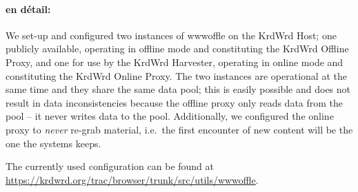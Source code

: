 \begin{longversion}
\paragraph{en d\'{e}tail:}
We set-up and configured two instances of wwwoffle on the KrdWrd Host;
one publicly available, operating in offline mode and constituting the KrdWrd Offline Proxy, and one for use by the KrdWrd Harvester, operating in online mode and constituting the KrdWrd Online Proxy. 
The two instances are operational at the same time and they share the same data pool; this is easily possible and does not result in data inconsistencies because the offline proxy only reads data from the pool -- it never writes data to the pool. Additionally, we configured the online proxy to \emph{never} re-grab material, i.e.~the first encounter of new content will be the one the systems keeps.

\noindent \linebreak
The currently used configuration can be found at \url{https://krdwrd.org/trac/browser/trunk/src/utils/wwwoffle}.







\end{longversion}
